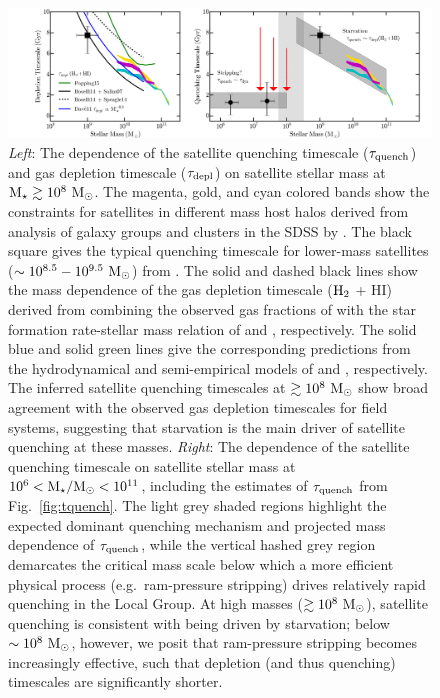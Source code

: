 \begin{figure}
 \centering
 \hspace*{-0.48in}
   \includegraphics[width=6.5in]{ch1_f6.png}
   \caption{\emph{Left}: The dependence of the satellite quenching
     timescale ($\tau_{\rm quench}$) and gas depletion timescale
     ($\tau_{\rm depl}$) on satellite stellar mass at ${\rm M}_{\star} \gtrsim
     10^{8}~{\rm M}_{\odot}$. The magenta, gold, and cyan colored bands show the
     constraints for satellites in different mass host halos derived
     from analysis of galaxy groups and clusters in the SDSS by
     \citet{wetzel13}. The black square gives the typical quenching
     timescale for lower-mass satellites ($\sim
     10^{8.5}-10^{9.5}~{\rm M}_{\odot}$) from \citet{wheeler14}. The solid and
     dashed black lines show the mass dependence of the gas depletion
     timescale (${\rm H}_{2}$ + H{\scriptsize I}) derived from
     combining the observed gas fractions of \citet{boselli14} with
     the star formation rate-stellar mass relation of \citet{salim07}
     and \citet{speagle14}, respectively. The solid blue and solid
     green lines give the corresponding predictions from the
     hydrodynamical and semi-empirical models of \citet{dave11a} and
     \citet{popping15}, respectively. The inferred satellite quenching
     timescales at $\gtrsim10^{8}~{\rm M}_{\odot}$ show broad agreement with the
     observed gas depletion timescales for field systems, suggesting
     that starvation is the main driver of satellite quenching at
     these masses. \emph{Right}: The dependence of the satellite
     quenching timescale on satellite stellar mass at $10^{6} <
     {\rm M}_{\star}/{\rm M}_{\odot} < 10^{11}$, including the estimates of $\tau_{\rm
       quench}$ from Fig.~\ref{fig:tquench}. The light grey shaded
     regions highlight the expected dominant quenching mechanism and
     projected mass dependence of $\tau_{\rm quench}$, while the
     vertical hashed grey region demarcates the critical mass scale
     below which a more efficient physical process (e.g.~ram-pressure
     stripping) drives relatively rapid quenching in the Local
     Group. At high masses ($\gtrsim10^{8}~{\rm M}_{\odot}$), satellite
     quenching is consistent with being driven by starvation; below
     $\sim10^{8}~{\rm M}_{\odot}$, however, we posit that ram-pressure stripping
     becomes increasingly effective, such that depletion (and thus
     quenching) timescales are significantly shorter.}

 \label{fig:cartoon}
\end{figure}


